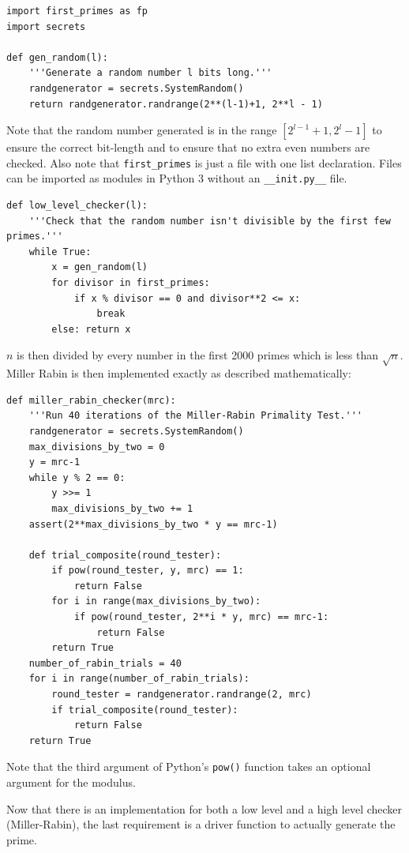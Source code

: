 \documentclass{article}
\begin{document}
\begin{verbatim}
import first_primes as fp
import secrets

def gen_random(l):
    '''Generate a random number l bits long.'''
    randgenerator = secrets.SystemRandom()
    return randgenerator.randrange(2**(l-1)+1, 2**l - 1)
\end{verbatim}

Note that the random number generated is in the range $[2^{l-1}+1, 2^l-1]$ to ensure the correct
bit-length and to ensure that no extra even numbers are checked. Also note that
\texttt{first\_primes} is just a file with one list declaration. Files can be imported as modules in
Python 3 without an \texttt{\_\_init.py\_\_} file.

\begin{verbatim}
def low_level_checker(l):
    '''Check that the random number isn't divisible by the first few primes.'''
    while True:
        x = gen_random(l)
        for divisor in first_primes:
            if x % divisor == 0 and divisor**2 <= x:
                break
        else: return x
\end{verbatim}

$n$ is then divided by every number in the first 2000 primes which is less than $\sqrt{n}$. Miller Rabin is then implemented exactly as described mathematically:

\begin{verbatim}
def miller_rabin_checker(mrc):
    '''Run 40 iterations of the Miller-Rabin Primality Test.'''
    randgenerator = secrets.SystemRandom()
    max_divisions_by_two = 0
    y = mrc-1
    while y % 2 == 0:
        y >>= 1
        max_divisions_by_two += 1
    assert(2**max_divisions_by_two * y == mrc-1)

    def trial_composite(round_tester):
        if pow(round_tester, y, mrc) == 1:
            return False
        for i in range(max_divisions_by_two):
            if pow(round_tester, 2**i * y, mrc) == mrc-1:
                return False
        return True
    number_of_rabin_trials = 40
    for i in range(number_of_rabin_trials):
        round_tester = randgenerator.randrange(2, mrc)
        if trial_composite(round_tester):
            return False
    return True
\end{verbatim}

Note that the third argument of Python's \texttt{pow()} function takes an optional argument for the modulus.

Now that there is an implementation for both a low level and a high level checker (Miller-Rabin),
the last requirement is a driver function to actually generate the prime.
\end{document}
